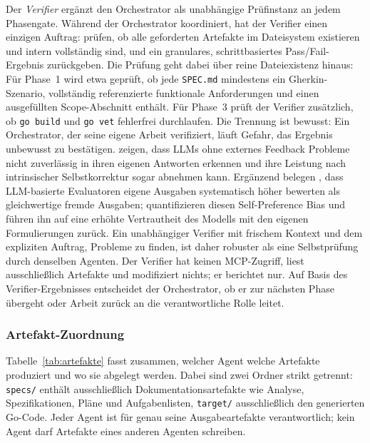 Der \emph{Verifier} ergänzt den Orchestrator als unabhängige Prüfinstanz an jedem Phasengate. Während der Orchestrator koordiniert, hat der Verifier einen einzigen Auftrag: prüfen, ob alle geforderten Artefakte im Dateisystem existieren und intern vollständig sind, und ein granulares, schrittbasiertes Pass/Fail-Ergebnis zurückgeben. Die Prüfung geht dabei über reine Dateiexistenz hinaus: Für Phase~1 wird etwa geprüft, ob jede \texttt{SPEC.md} mindestens ein Gherkin-Szenario, vollständig referenzierte funktionale Anforderungen und einen ausgefüllten Scope-Abschnitt enthält. Für Phase~3 prüft der Verifier zusätzlich, ob \texttt{go build} und \texttt{go vet} fehlerfrei durchlaufen. Die Trennung ist bewusst: Ein Orchestrator, der seine eigene Arbeit verifiziert, läuft Gefahr, das Ergebnis unbewusst zu bestätigen. \textcite{huang2024cannotselfcorrect} zeigen, dass LLMs ohne externes Feedback Probleme nicht zuverlässig in ihren eigenen Antworten erkennen und ihre Leistung nach intrinsischer Selbstkorrektur sogar abnehmen kann. Ergänzend belegen \textcite{panickssery2024selfrecognition}, dass LLM-basierte Evaluatoren eigene Ausgaben systematisch höher bewerten als gleichwertige fremde Ausgaben; \textcite{wataoka2024selfpreference} quantifizieren diesen Self-Preference Bias und führen ihn auf eine erhöhte Vertrautheit des Modells mit den eigenen Formulierungen zurück. Ein unabhängiger Verifier mit frischem Kontext und dem expliziten Auftrag, Probleme zu finden, ist daher robuster als eine Selbstprüfung durch denselben Agenten. Der Verifier hat keinen MCP-Zugriff, liest ausschließlich Artefakte und modifiziert nichts; er berichtet nur. Auf Basis des Verifier-Ergebnisses entscheidet der Orchestrator, ob er zur nächsten Phase übergeht oder Arbeit zurück an die verantwortliche Rolle leitet.

\subsubsection{Artefakt-Zuordnung}

Tabelle~\ref{tab:artefakte} fasst zusammen, welcher Agent welche Artefakte produziert und wo sie abgelegt werden. Dabei sind zwei Ordner strikt getrennt: \texttt{specs/} enthält ausschließlich Dokumentationsartefakte wie Analyse, Spezifikationen, Pläne und Aufgabenlisten, \texttt{target/} ausschließlich den generierten Go-Code. Jeder Agent ist für genau seine Ausgabeartefakte verantwortlich; kein Agent darf Artefakte eines anderen Agenten schreiben.

